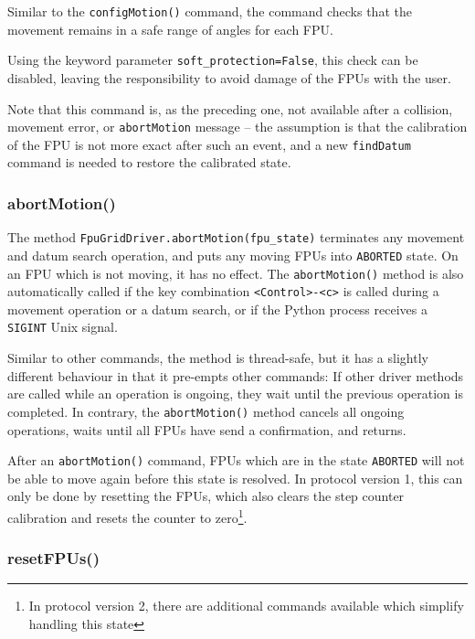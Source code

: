 \documentclass[11pt,a4paper]{scrartcl}
\begin{document}
Similar to the \texttt{configMotion()} command, the command checks
that the movement remains in a safe range of angles for each
FPU.

Using the keyword parameter \texttt{soft\_protection=False}, this
check can be disabled, leaving the responsibility to avoid damage of
the FPUs with the user.

Note that this command is, as the preceding one, not available after a
collision, movement error, or \texttt{abortMotion} message -- the
assumption is that the calibration of the FPU is not more exact after
such an event, and a new \texttt{findDatum} command is needed to
restore the calibrated state.


\subsubsection{abortMotion()}


\begin{sloppypar}
The method \texttt{FpuGridDriver.abortMotion(fpu\_state)} terminates
any movement and datum search operation, and puts any moving FPUs into
\texttt{ABORTED} state. On an FPU which is not moving, it has no
effect.  The \texttt{abortMotion()} method is also automatically
called if the key combination \verb+<Control>-<c>+ is called during a
movement operation or a datum search, or if the Python process
receives a \texttt{SIGINT} Unix signal.
\end{sloppypar}

Similar to other commands, the method is thread-safe, but it has a
slightly different behaviour in that it pre-empts other commands: If
other driver methods are called while an operation is ongoing, they
wait until the previous operation is completed. In contrary, the
\texttt{abortMotion()} method cancels all ongoing operations, waits
until all FPUs have send a confirmation, and returns.

After an \texttt{abortMotion()} command, FPUs which are in the state
\texttt{ABORTED} will not be able to move again before this state is
resolved. In protocol version 1, this can only be done by resetting
the FPUs, which also clears the step counter calibration and resets
the counter to zero\footnote{In protocol version 2, there are
  additional commands available which simplify handling this state}.


\subsubsection{resetFPUs()}
\end{document}
